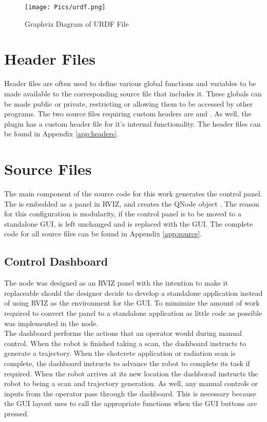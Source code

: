 \begin{figure}[h]
    \centering
    \texttt{[image: Pics/urdf.png]}
    \caption{Graphviz Diagram of URDF File}
    \label{fig:urdf}
\end{figure}

\section{Header Files}
Header files are often used to define various global functions and variables to be made available to the corresponding source file that includes it. These globals can be made public or private, restricting or allowing them to be accessed by other programs. The two source files requiring custom headers are  and . As well, the  plugin has a custom header file for it's internal functionality. The header files can be found in Appendix \ref{app:headers}.\\

\section{Source Files}
The main component of the source code for this work generates the control panel. The  is embedded as a panel in RVIZ, and creates the QNode object . The reason for this configuration is modularity, if the control panel is to be moved to a standalone GUI,  is left unchanged and  is replaced with the GUI. The complete code for all source files can be found in Appendix \ref{app:source}.
\subsection{Control Dashboard}
The  node was designed as an RVIZ panel with the intention to make it replaceable should the designer decide to develop a standalone application instead of using RVIZ as the environment for the GUI. To mimimize the amount of work required to convert the panel to a standalone application as little code as possible was implemented in the node.\\
The dashboard performs the actions that an operator would during manual control. When the robot is finished taking a scan, the dashboard instructs  to generate a trajectory. When the shotcrete application or radiation scan is complete, the dashboard instructs  to advance the robot to complete its task if required. When the robot arrives at its new location the dashborad instructs the robot to being a scan and trajectory generation. As well, any manual controls or inputs from the operator pass through the dashboard. This is necessary because the GUI layout uses  to call the appropriate  functions when the GUI buttons are pressed.\\
